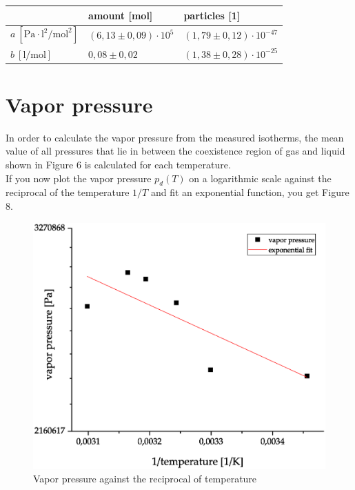 \documentclass[10pt,a4paper]{article}
\begin{document}
\begin{center}
\begin{tabularx}{0.8\textwidth} { 
  | >{\raggedright\arraybackslash}X 
  | >{\centering\arraybackslash}X 
  | >{\raggedleft\arraybackslash}X | }
   \hline
  & amount [mol] & particles [1] \\
 \hline
 $a \ [\textrm{Pa} \cdot  \textrm{l}^2\textrm{/mol} ^2]$ & $(6,13 \pm 0,09) \cdot 10^{5}$  & $(1,79 \pm 0,12) \cdot 10^{-47}$ \\
 \hline
 $b \ [\textrm{l/mol} ] $ &$ 0,08 \pm 0,02 $ & $(1,38 \pm 0,28) \cdot 10^{-25}$  \\
\hline
\end{tabularx}
\end{center}


\section{Vapor pressure}
In order to calculate the vapor pressure from the measured isotherms, the mean value of all pressures that lie in between the coexistence region of gas and liquid shown in Figure 6 is calculated for each temperature. \\
If you now plot the vapor pressure $p_d(T)$ on a logarithmic scale against the reciprocal of the temperature $1/T$ and fit an exponential function, you get Figure 8.

\begin{figure}[hbt!]
\includegraphics[width=400pt, center]{exponentialFit.eps}
\caption{Vapor pressure against the reciprocal of temperature}
\label{fig:length_eight_mouse}
\end{figure}
\end{document}

